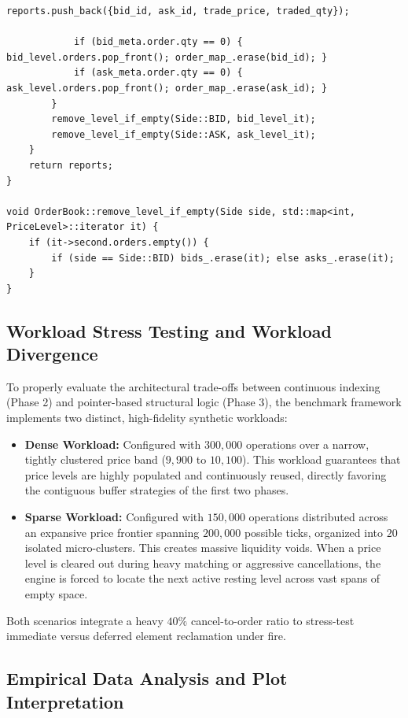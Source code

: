 \documentclass{article}
\begin{document}
\begin{lstlisting}[caption={Phase 3 Matching and Immediate Cancellation Logic (orderbook.cpp)}]
            reports.push_back({bid_id, ask_id, trade_price, traded_qty});

            if (bid_meta.order.qty == 0) { bid_level.orders.pop_front(); order_map_.erase(bid_id); }
            if (ask_meta.order.qty == 0) { ask_level.orders.pop_front(); order_map_.erase(ask_id); }
        }
        remove_level_if_empty(Side::BID, bid_level_it);
        remove_level_if_empty(Side::ASK, ask_level_it);
    }
    return reports;
}

void OrderBook::remove_level_if_empty(Side side, std::map<int, PriceLevel>::iterator it) {
    if (it->second.orders.empty()) {
        if (side == Side::BID) bids_.erase(it); else asks_.erase(it);
    }
}
\end{lstlisting}

\subsection{Workload Stress Testing and Workload Divergence}

To properly evaluate the architectural trade-offs between continuous indexing (Phase 2) and pointer-based structural logic (Phase 3), the benchmark framework implements two distinct, high-fidelity synthetic workloads:

\begin{itemize}
    \item \textbf{Dense Workload:} Configured with $300,000$ operations over a narrow, tightly clustered price band ($9,900$ to $10,100$). This workload guarantees that price levels are highly populated and continuously reused, directly favoring the contiguous buffer strategies of the first two phases.
    \item \textbf{Sparse Workload:} Configured with $150,000$ operations distributed across an expansive price frontier spanning $200,000$ possible ticks, organized into $20$ isolated micro-clusters. This creates massive liquidity voids. When a price level is cleared out during heavy matching or aggressive cancellations, the engine is forced to locate the next active resting level across vast spans of empty space.
\end{itemize}

Both scenarios integrate a heavy $40\%$ cancel-to-order ratio to stress-test immediate versus deferred element reclamation under fire.

\subsection{Empirical Data Analysis and Plot Interpretation}
\end{document}
